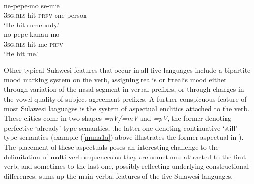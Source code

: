 \ea 
{}\\
\ea \label{muna1a}
\gll ne-pepe-mo se-mie \\
\textsc{3}\textsc{sg}.\textsc{rls}-hit-\textsc{prfv} one-person \\
\glft `He hit somebody.' \\ 
\ex \label{muna1b}
\gll no-pepe-kanau-mo \\ 
\textsc{3}\textsc{sg}.\textsc{rls}-hit-me-\textsc{prfv} \\
\glft `He hit me.' \\ 
\z
\z

Other typical Sulawesi features that occur in all five languages include a bipartite mood marking system on the verb, assigning realis or irrealis mood either through variation of the nasal segment in verbal prefixes, or through changes in the vowel quality of subject agreement prefixes. A further conspicuous feature of most Sulawesi languages is the system of aspectual enclitics attached to the verb. These clitics come in two shapes \textit{=nV/=mV} and \textit{=pV}, the former denoting perfective `already'-type semantics, the latter one denoting continuative `still'-type semantics (example (\ref{muna1a}) above illustrates the former aspectual in ). The placement of these aspectuals poses an interesting challenge to the delimitation of multi-verb sequences as they are sometimes attracted to the first verb, and sometimes to the last one, possibly reflecting underlying constructional differences.  sums up the main verbal features of the five Sulawesi languages.

\begin{table}
\caption[Basic verbal features of the Sulawesi languages]{Overview of basic verbal features of the Sulawesi languages in the data set. Constituent order lists only the basic pattern, pragmatically induced alternative patterns are often also available.}
\label{table:overviewsulawesi}
\end{table}

